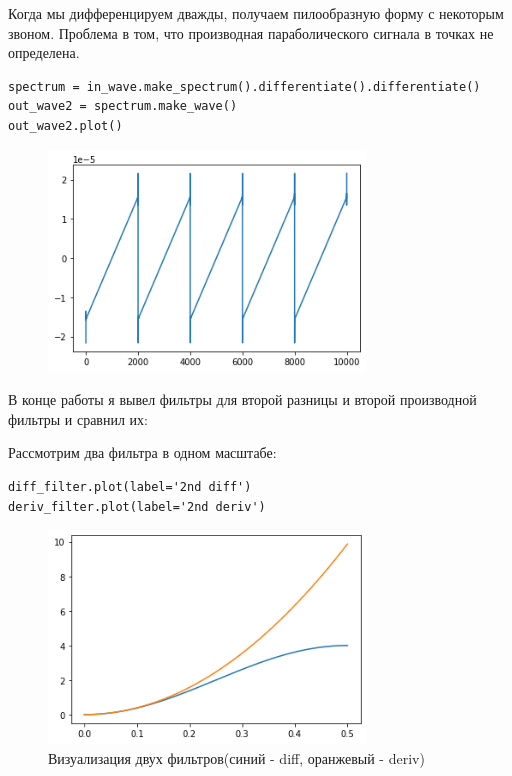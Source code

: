 \documentclass[a4paper,12pt]{report}
\begin{document}
Когда мы дифференцируем дважды, получаем пилообразную форму с некоторым звоном. Проблема в том, что производная параболического сигнала в точках не определена.

\begin{lstlisting}[H]
spectrum = in_wave.make_spectrum().differentiate().differentiate()
out_wave2 = spectrum.make_wave()
out_wave2.plot()
\end{lstlisting}

\begin{figure}[H]
        \centering
        \includegraphics[width=0.75\textwidth]{12.png}
        \caption{}
        \label{12}
\end{figure}

В конце работы я вывел фильтры для второй разницы и второй производной фильтры и сравнил их:

Рассмотрим два фильтра в одном масштабе:

\begin{lstlisting}[caption=Визуализация двух фильтров]
diff_filter.plot(label='2nd diff')
deriv_filter.plot(label='2nd deriv')
\end{lstlisting}

\begin{figure}[H]
        \centering
        \includegraphics[width=0.75\textwidth]{13.png}
        \caption{Визуализация двух фильтров(синий - diff, оранжевый - deriv)}
        \label{13}
\end{figure}
\end{document}
